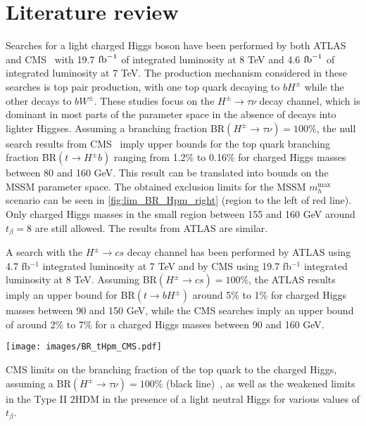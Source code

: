 \section{Literature review}\label{sec:limits}

Searches for a light charged Higgs boson have been performed by both ATLAS and CMS~\cite{TheATLAScollaboration:2013wia,CMS:2014cdp} with 19.7 $ \text{fb}^{-1} $ of integrated luminosity at 8 TeV and 4.6 $ \text{fb}^{-1} $ of integrated luminosity at 7 TeV. The production mechanism considered in these searches is top pair production, with one top quark decaying to $bH^{\pm} $ while the other decays to $bW^\pm$. These studies focus on the $H^{\pm} \rightarrow \tau \nu$ decay channel, which is dominant in most parts of the parameter space in the absence of decays into lighter Higgses. Assuming a branching fraction BR$(H^{\pm} \rightarrow \tau \nu) = 100 \%$, the null search results from CMS~\cite{CMS:2014cdp} imply upper bounds for the top quark branching fraction BR$(t \rightarrow H^{\pm} b)$ ranging from 1.2\% to 0.16\% for charged Higgs masses between 80 and 160 GeV. This result can be translated into bounds on the MSSM parameter space. The obtained exclusion limits for the MSSM $m_h^\text{max}$ scenario can be seen in \autoref{fig:lim_BR_Hpm_right} (region to the left of red line). Only charged Higgs masses in the small region between 155 and 160 GeV around $t_{\beta} = 8$ are still allowed. The results from ATLAS \cite{TheATLAScollaboration:2013wia} are similar.
 
A search with the $H^{\pm} \rightarrow cs$ decay channel has been performed by ATLAS \cite{Aad:2013hla} using 4.7 fb$^{-1}$ integrated luminosity at 7 TeV and by CMS \cite{CMS:2014kga} using 19.7 fb$^{-1}$ integrated luminosity at 8 TeV. Assuming BR$(H^{\pm} \rightarrow c s) = 100 \%$, the ATLAS results imply an upper bound for BR$(t \rightarrow b H^{\pm} )$ around 5\% to 1\% for charged Higgs masses between 90 and 150 GeV, while the CMS searches imply an upper bound of around 2\% to 7\% for a charged Higgs masses between 90 and 160 GeV.

\begin{marginfigure}
 	\texttt{[image: images/BR\_tHpm\_CMS.pdf]}
    \caption{CMS limits on the branching fraction of the top quark to the charged Higgs, assuming a BR$(H^{\pm} \rightarrow \tau \nu) = 100\%$ (black line)~\cite{CMS:2014cdp}, as well as the weakened limits in the Type II $2$HDM in the presence of a light neutral Higgs for various values of $t_{\beta}$.}
\label{fig:lim_BR_Hpm_left}
\end{marginfigure}

